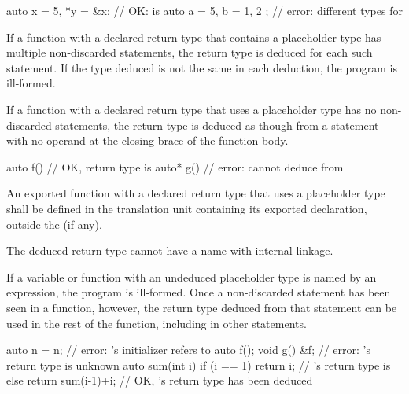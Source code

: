 \begin{example}
\begin{codeblock}
auto x = 5, *y = &x;            // OK:  is 
auto a = 5, b = { 1, 2 };       // error: different types for 
\end{codeblock}
\end{example}

\pnum
If a function with a declared return type that contains a placeholder type has
multiple non-discarded  statements, the return type is deduced for each
such  statement. If the type deduced is not the same in each
deduction, the program is ill-formed.

\pnum
If a function with a declared return type that uses a placeholder type has no
non-discarded  statements, the return type is deduced as though from a
 statement with no operand at the closing brace of the function
body.
\begin{example}
\begin{codeblock}
auto  f() { }                   // OK, return type is 
auto* g() { }                   // error: cannot deduce  from 
\end{codeblock}
\end{example}

\pnum
An exported function
with a declared return type that uses a placeholder type
shall be defined in the translation unit
containing its exported declaration,
outside the  (if any).
\begin{note}
The deduced return type cannot have
a name with internal linkage.
\end{note}

\pnum
If a variable or function with an undeduced placeholder type is named by an
expression, the program is ill-formed.  Once a
non-discarded  statement has been seen in a function, however, the return type deduced
from that statement can be used in the rest of the function, including in other
 statements.
\begin{example}
\begin{codeblock}
auto n = n;                     // error: 's initializer refers to 
auto f();
void g() { &f; }                // error: 's return type is unknown
auto sum(int i) {
  if (i == 1)
    return i;                   // 's return type is 
  else
    return sum(i-1)+i;          // OK, 's return type has been deduced
}
\end{codeblock}
\end{example}

